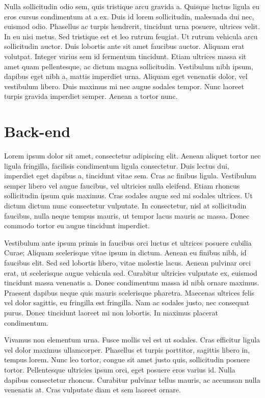 \documentclass[letterpaper,10pt,english]{sphinxmanual}
\begin{document}
Nulla sollicitudin odio sem, quis tristique arcu gravida a. Quisque luctus ligula eu eros cursus condimentum at a ex. Duis id lorem sollicitudin, malesuada dui nec, euismod odio. Phasellus ac turpis hendrerit, tincidunt urna posuere, ultrices velit. In eu nisi metus. Sed tristique est et leo rutrum feugiat. Ut rutrum vehicula arcu sollicitudin auctor. Duis lobortis ante sit amet faucibus auctor. Aliquam erat volutpat. Integer varius sem id fermentum tincidunt. Etiam ultrices massa sit amet quam pellentesque, ac dictum magna sollicitudin. Vestibulum nibh ipsum, dapibus eget nibh a, mattis imperdiet urna. Aliquam eget venenatis dolor, vel vestibulum libero. Duis maximus mi nec augue sodales tempor. Nunc laoreet turpis gravida imperdiet semper. Aenean a tortor nunc.


\chapter{Back-end}
\label{back-end::doc}\label{back-end:back-end}
Lorem ipsum dolor sit amet, consectetur adipiscing elit. Aenean aliquet tortor nec ligula fringilla, facilisis condimentum ligula consectetur. Duis lectus dui, imperdiet eget dapibus a, tincidunt vitae sem. Cras ac finibus ligula. Vestibulum semper libero vel augue faucibus, vel ultricies nulla eleifend. Etiam rhoncus sollicitudin ipsum quis maximus. Cras sodales augue sed mi sodales ultrices. Ut dictum dictum nunc consectetur vulputate. In consectetur, nisl at sollicitudin faucibus, nulla neque tempus mauris, ut tempor lacus mauris ac massa. Donec commodo tortor eu augue tincidunt imperdiet.

Vestibulum ante ipsum primis in faucibus orci luctus et ultrices posuere cubilia Curae; Aliquam scelerisque vitae ipsum in dictum. Aenean eu finibus nibh, id faucibus elit. Sed sed lobortis libero, vitae molestie lacus. Aenean pulvinar orci erat, ut scelerisque augue vehicula sed. Curabitur ultricies vulputate ex, euismod tincidunt massa venenatis a. Donec condimentum massa id nibh ornare maximus. Praesent dapibus neque quis mauris scelerisque pharetra. Maecenas ultrices felis vel dolor sagittis, eu fringilla est fringilla. Nam ac sodales justo, nec consequat purus. Donec tincidunt laoreet mi non lobortis. In maximus placerat condimentum.

Vivamus non elementum urna. Fusce mollis vel est ut sodales. Cras efficitur ligula vel dolor maximus ullamcorper. Phasellus et turpis porttitor, sagittis libero in, tempus lorem. Nunc leo tortor, congue sit amet justo quis, sollicitudin posuere tortor. Pellentesque ultricies ipsum orci, eget posuere eros varius id. Nulla dapibus consectetur rhoncus. Curabitur pulvinar tellus mauris, ac accumsan nulla venenatis at. Cras vulputate diam et sem laoreet ornare.
\end{document}
